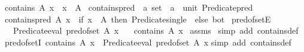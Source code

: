 \begin{isabellebody}
\ {\isachardoublequoteopen}contains\ A\ x\ {\isasymlongleftrightarrow}\ x\ {\isasymin}\ A{\isachardoublequoteclose}\isanewline
\isanewline
{}\isamarkupfalse%
\ contains{\isacharunderscore}{\kern0pt}pred\ {\isacharcolon}{\kern0pt}{\isacharcolon}{\kern0pt}\ {\isachardoublequoteopen}{\isacharprime}{\kern0pt}a\ set\ {\isacharequal}{\kern0pt}{\isachargreater}{\kern0pt}\ {\isacharprime}{\kern0pt}a\ {\isacharequal}{\kern0pt}{\isachargreater}{\kern0pt}\ unit\ Predicate{\isachardot}{\kern0pt}pred{\isachardoublequoteclose}\isanewline
{}\ {\isachardoublequoteopen}contains{\isacharunderscore}{\kern0pt}pred\ A\ x\ {\isacharequal}{\kern0pt}\ {\isacharparenleft}{\kern0pt}if\ x\ {\isasymin}\ A\ then\ Predicate{\isachardot}{\kern0pt}single\ {\isacharparenleft}{\kern0pt}{\isacharparenright}{\kern0pt}\ else\ bot{\isacharparenright}{\kern0pt}{\isachardoublequoteclose}\isanewline
\isanewline
{}\isamarkupfalse%
\ pred{\isacharunderscore}{\kern0pt}of{\isacharunderscore}{\kern0pt}setE{\isacharcolon}{\kern0pt}\isanewline
\ \ \ {\isachardoublequoteopen}Predicate{\isachardot}{\kern0pt}eval\ {\isacharparenleft}{\kern0pt}pred{\isacharunderscore}{\kern0pt}of{\isacharunderscore}{\kern0pt}set\ A{\isacharparenright}{\kern0pt}\ x{\isachardoublequoteclose}\isanewline
\ \ \ {\isachardoublequoteopen}contains\ A\ x{\isachardoublequoteclose}\isanewline
%
\isadelimproof
%
\endisadelimproof
%
\isatagproof
{}\isamarkupfalse%
\ assms\ \isamarkupfalse%
{\isacharparenleft}{\kern0pt}simp\ add{\isacharcolon}{\kern0pt}\ contains{\isacharunderscore}{\kern0pt}def{\isacharparenright}{\kern0pt}%
\endisatagproof
{\isafoldproof}%
%
\isadelimproof
\isanewline
%
\endisadelimproof
\isanewline
{}\isamarkupfalse%
\ pred{\isacharunderscore}{\kern0pt}of{\isacharunderscore}{\kern0pt}setI{\isacharcolon}{\kern0pt}\ {\isachardoublequoteopen}contains\ A\ x\ {\isacharequal}{\kern0pt}{\isacharequal}{\kern0pt}{\isachargreater}{\kern0pt}\ Predicate{\isachardot}{\kern0pt}eval\ {\isacharparenleft}{\kern0pt}pred{\isacharunderscore}{\kern0pt}of{\isacharunderscore}{\kern0pt}set\ A{\isacharparenright}{\kern0pt}\ x{\isachardoublequoteclose}\isanewline
%
\isadelimproof
%
\endisadelimproof
%
\isatagproof
{}\isamarkupfalse%
{\isacharparenleft}{\kern0pt}simp\ add{\isacharcolon}{\kern0pt}\ contains{\isacharunderscore}{\kern0pt}def{\isacharparenright}{\kern0pt}%
\endisatagproof
{\isafoldproof}%
%
\isadelimproof
\isanewline
%
\endisadelimproof
\isanewline
{}\isamarkupfalse%

\end{isabellebody}
